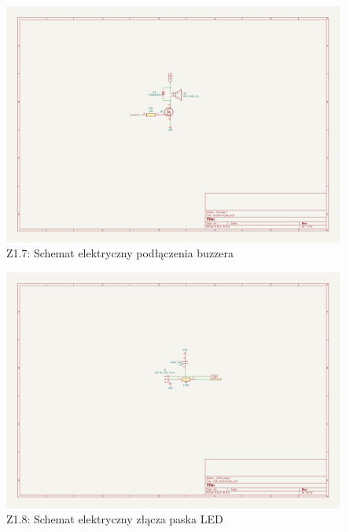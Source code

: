 \documentclass[twoside]{article}
\numberwithin{equation}{section}
\begin{document}
\newpage
\thispagestyle{empty}
\begin{figure}[H]
    \centering
    \includegraphics[width=1.5\textwidth, angle=90]{zalaczniki/7.png}
    \caption*{Z1.7: Schemat elektryczny podłączenia buzzera}
\end{figure}

\newpage
\thispagestyle{empty}
\begin{figure}[H]
    \centering
    \includegraphics[width=1.5\textwidth, angle=90]{zalaczniki/8.png}
    \caption*{Z1.8: Schemat elektryczny złącza paska LED}
\end{figure}
\end{document}
